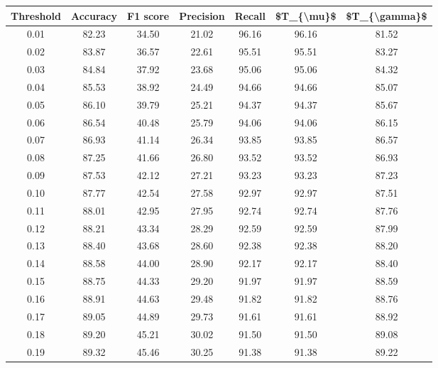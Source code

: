 \begin{tabular}{|c|c|c|c|c|c|c|}
\hline
 Threshold &  Accuracy &  F1 score &  Precision &  Recall &  \$T\_\{\textbackslash mu\}\$ &  \$T\_\{\textbackslash gamma\}\$ \\
\hline
      0.01 &     82.23 &     34.50 &      21.02 &   96.16 &      96.16 &         81.52 \\
      0.02 &     83.87 &     36.57 &      22.61 &   95.51 &      95.51 &         83.27 \\
      0.03 &     84.84 &     37.92 &      23.68 &   95.06 &      95.06 &         84.32 \\
      0.04 &     85.53 &     38.92 &      24.49 &   94.66 &      94.66 &         85.07 \\
      0.05 &     86.10 &     39.79 &      25.21 &   94.37 &      94.37 &         85.67 \\
      0.06 &     86.54 &     40.48 &      25.79 &   94.06 &      94.06 &         86.15 \\
      0.07 &     86.93 &     41.14 &      26.34 &   93.85 &      93.85 &         86.57 \\
      0.08 &     87.25 &     41.66 &      26.80 &   93.52 &      93.52 &         86.93 \\
      0.09 &     87.53 &     42.12 &      27.21 &   93.23 &      93.23 &         87.23 \\
      0.10 &     87.77 &     42.54 &      27.58 &   92.97 &      92.97 &         87.51 \\
      0.11 &     88.01 &     42.95 &      27.95 &   92.74 &      92.74 &         87.76 \\
      0.12 &     88.21 &     43.34 &      28.29 &   92.59 &      92.59 &         87.99 \\
      0.13 &     88.40 &     43.68 &      28.60 &   92.38 &      92.38 &         88.20 \\
      0.14 &     88.58 &     44.00 &      28.90 &   92.17 &      92.17 &         88.40 \\
      0.15 &     88.75 &     44.33 &      29.20 &   91.97 &      91.97 &         88.59 \\
      0.16 &     88.91 &     44.63 &      29.48 &   91.82 &      91.82 &         88.76 \\
      0.17 &     89.05 &     44.89 &      29.73 &   91.61 &      91.61 &         88.92 \\
      0.18 &     89.20 &     45.21 &      30.02 &   91.50 &      91.50 &         89.08 \\
      0.19 &     89.32 &     45.46 &      30.25 &   91.38 &      91.38 &         89.22 \\

\end{tabular}
